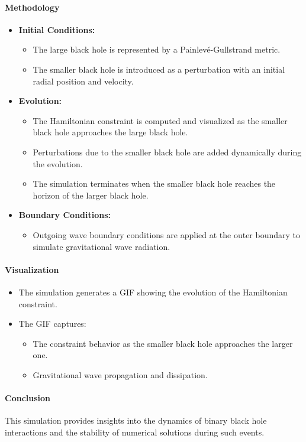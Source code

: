 \documentclass[12pt]{article}
\begin{document}
\paragraph{Methodology}
\begin{itemize}
    \item \textbf{Initial Conditions:}
    \begin{itemize}
        \item The large black hole is represented by a Painlevé-Gullstrand metric.
        \item The smaller black hole is introduced as a perturbation with an initial radial position and velocity.
    \end{itemize}
    \item \textbf{Evolution:}
    \begin{itemize}
        \item The Hamiltonian constraint is computed and visualized as the smaller black hole approaches the large black hole.
        \item Perturbations due to the smaller black hole are added dynamically during the evolution.
        \item The simulation terminates when the smaller black hole reaches the horizon of the larger black hole.
    \end{itemize}
    \item \textbf{Boundary Conditions:}
    \begin{itemize}
        \item Outgoing wave boundary conditions are applied at the outer boundary to simulate gravitational wave radiation.
    \end{itemize}
\end{itemize}

\paragraph{Visualization}
\begin{itemize}
    \item The simulation generates a GIF showing the evolution of the Hamiltonian constraint.
    \item The GIF captures:
    \begin{itemize}
        \item The constraint behavior as the smaller black hole approaches the larger one.
        \item Gravitational wave propagation and dissipation.
    \end{itemize}
\end{itemize}

\paragraph{Conclusion}
This simulation provides insights into the dynamics of binary black hole interactions and the stability of numerical solutions during such events.




\end{document}
